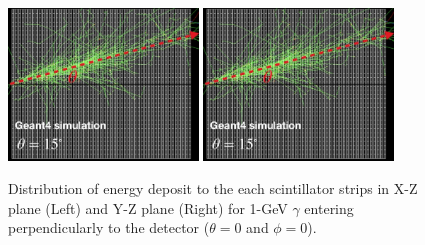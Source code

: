 \documentclass[jkps,preprint,fleqn,showpacs,showkeys]{revtex4}
\begin{document}
\begin{figure}[!hbt]
\includegraphics[width=0.45\textwidth]{figures/EventDisplay.jpg}
\includegraphics[width=0.45\textwidth]{figures/EventDisplay.jpg}

\caption{Distribution of energy deposit to the each scintillator strips in X-Z plane (Left) and Y-Z plane (Right) for 1-GeV $\gamma$ entering perpendicularly to the detector ($\theta=0$ and $\phi=0$).}
\label{fig:Evt_Dis}
\end{figure}





\end{document}
